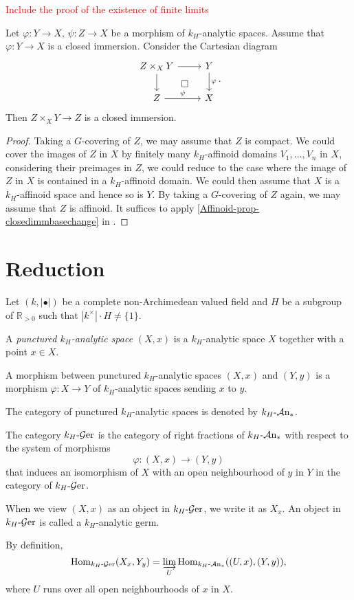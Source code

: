 \textcolor{red}{Include the proof of the existence of finite limits}
\begin{proposition}
    Let $\varphi:Y\rightarrow X$, $\psi:Z\rightarrow X$ be a morphism of $k_H$-analytic spaces. Assume that $\varphi:Y\rightarrow X$ is a closed immersion. Consider the Cartesian diagram
    \[
        \begin{tikzcd}
            Z\times_X Y \arrow[r] \arrow[d] \arrow[rd, "\square", phantom] & Y \arrow[d,"\varphi"] \\
            Z \arrow[r,"\psi"]                                                    & X          
        \end{tikzcd}.  
    \]
    Then $Z\times_X Y\rightarrow Z$ is a closed immersion.
\end{proposition}
\begin{proof}
    Taking a $G$-covering of $Z$, we may assume that $Z$ is compact. 
    We could cover the images of $Z$ in $X$ by finitely many $k_H$-affinoid domains $V_1,\ldots,V_n$ in $X$, considering their preimages in $Z$, we could reduce to the case where the image of $Z$ in $X$ is contained in a $k_H$-affinoid domain. We could then assume that $X$ is a $k_H$-affinoid space and hence so is $Y$. By taking a $G$-covering of $Z$ again, we may assume that $Z$ is affinoid. It suffices to apply \cref{Affinoid-prop-closedimmbasechange} in .
\end{proof}

\section{Reduction}
Let $(k,|\bullet|)$ be a complete non-Archimedean valued field and $H$ be a subgroup of $\mathbb{R}_{>0}$ such that $|k^{\times}|\cdot H\neq \{1\}$.
\begin{definition}
    A \emph{punctured $k_H$-analytic space} $(X,x)$ is a $k_H$-analytic space $X$ together with a point $x\in X$.

    A morphism between punctured $k_H$-analytic spaces $(X,x)$ and $(Y,y)$ is a morphism $\varphi:X\rightarrow Y$ of $k_H$-analytic spaces sending $x$ to $y$.

    The category of punctured $k_H$-analytic spaces is denoted by $k_H\text{-}\mathcal{A}\mathrm{n}_*$.
\end{definition}

\begin{definition}
    The category $k_H\text{-}\mathcal{G}\mathrm{er}$ is the category of right fractions of $k_H\text{-}\mathcal{A}\mathrm{n}_*$ with respect to the system of morphisms
    \[
        \varphi:(X,x)\rightarrow (Y,y)  
    \]
    that induces an isomorphism of $X$ with an open neighbourhood of $y$ in $Y$ in the category of $k_H\text{-}\mathcal{G}\mathrm{er}$.

    When we view $(X,x)$ as an object in $k_H\text{-}\mathcal{G}\mathrm{er}$, we write it as $X_x$. An object in $k_H\text{-}\mathcal{G}\mathrm{er}$ is called a $k_H$-analytic germ.
\end{definition}
By definition,
\[
    \operatorname{Hom}_{k_H\text{-}\mathcal{G}\mathrm{er}}(X_x,Y_y)=\varinjlim_{U}\operatorname{Hom}_{k_H\text{-}\mathcal{A}\mathrm{n}_*}((U,x),(Y,y)),  
\]
where $U$ runs over all open neighbourhoods of $x$ in $X$. 

